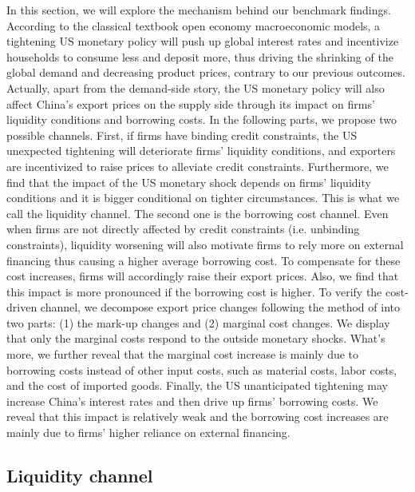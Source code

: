 In this section, we will explore the mechanism behind our benchmark findings. According to the classical textbook open economy macroeconomic models, a tightening US monetary policy will push up global interest rates and incentivize households to consume less and deposit more, thus driving the shrinking of the global demand and decreasing product prices, contrary to our previous outcomes. Actually, apart from the demand-side story, the US monetary policy will also affect China's export prices on the supply side through its impact on firms' liquidity conditions and borrowing costs. In the following parts, we propose two possible channels. First, if firms have binding credit constraints, the US unexpected tightening will deteriorate firms' liquidity conditions, and exporters are incentivized to raise prices to alleviate credit constraints. Furthermore, we find that the impact of the US monetary shock depends on firms' liquidity conditions and it is bigger conditional on tighter circumstances. This is what we call the liquidity channel. The second one is the borrowing cost channel. Even when firms are not directly affected by credit constraints (i.e. unbinding constraints), liquidity worsening will also motivate firms to rely more on external financing thus causing a higher average borrowing cost. To compensate for these cost increases, firms will accordingly raise their export prices. Also, we find that this impact is more pronounced if the borrowing cost is higher. To verify the cost-driven channel, we decompose export price changes following the method of \cite{deloecker2012markups}into two parts: (1) the mark-up changes and (2) marginal cost changes. We display that only the marginal costs respond to the outside monetary shocks. What's more, we further reveal that the marginal cost increase is mainly due to borrowing costs instead of other input costs, such as material costs, labor costs, and the cost of imported goods. Finally, the US unanticipated tightening may increase China's interest rates and then drive up firms' borrowing costs. We reveal that this impact is relatively weak and the borrowing cost increases are mainly due to firms' higher reliance on external financing. 



\subsection{Liquidity channel}

